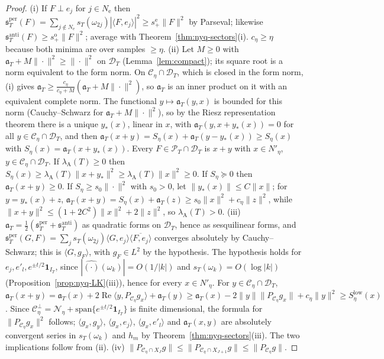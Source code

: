 \documentclass[11pt]{amsart}
\theoremstyle{definition}
\theoremstyle{remark}
\newcommand{\Rel}{\operatorname{Re}}
\newcommand{\PT}{\mathcal P_T}
\newcommand{\IT}{I_T}
\newcommand{\lamA}{\lambda_{\mathrm A}(T)}
\begin{document}
\begin{proof}
(i) If $F\perp e_j$ for $j\in N_{\mathrm e}$ then $\mathfrak s^{\mathrm{per}}_T(F)=\sum_{j\notin N_{\mathrm e}}s_T(\omega_{2j})|\langle F,e_j\rangle|^2
\ge s^{\mathrm e}_+\|F\|^2$ by Parseval; likewise $\mathfrak s^{\mathrm{anti}}_T(F)\ge s^{\mathrm o}_+\|F\|^2$; average with
Theorem~\ref{thm:nyq-sectors}(i). $c_\eta\ge\eta$ because both minima are over samples $\ge\eta$.
(ii) Let $M\ge0$ with $\mathfrak a_T+M\|\cdot\|^2\ge\|\cdot\|^2$ on $\mathcal D_T$ (Lemma~\ref{lem:compact}); its square root is a
norm equivalent to the form norm. On $\mathcal C_\eta\cap\mathcal D_T$, which is closed in the form norm, (i) gives
$\mathfrak a_T\ge\frac{c_\eta}{c_\eta+M}(\mathfrak a_T+M\|\cdot\|^2)$, so $\mathfrak a_T$ is an inner product on it with an
equivalent complete norm. The functional $y\mapsto\mathfrak a_T(y,x)$ is bounded for this norm (Cauchy--Schwarz for
$\mathfrak a_T+M\|\cdot\|^2$), so by the Riesz representation theorem there is a unique $y_*(x)$, linear in $x$, with
$\mathfrak a_T(y,x+y_*(x))=0$ for all $y\in\mathcal C_\eta\cap\mathcal D_T$, and then
$\mathfrak a_T(x+y)=S_\eta(x)+\mathfrak a_T(y-y_*(x))\ge S_\eta(x)$ with $S_\eta(x)=\mathfrak a_T(x+y_*(x))$. Every
$F\in\PT\cap\mathcal D_T$ is $x+y$ with $x\in N'_\eta$, $y\in\mathcal C_\eta\cap\mathcal D_T$. If $\lamA\ge0$ then
$S_\eta(x)\ge\lamA\|x+y_*\|^2\ge\lamA\|x\|^2\ge0$. If $S_\eta\succeq0$ then $\mathfrak a_T(x+y)\ge0$. If
$S_\eta\ge s_0\|\cdot\|^2$ with $s_0>0$, let $\|y_*(x)\|\le C\|x\|$; for $y=y_*(x)+z$,
$\mathfrak a_T(x+y)=S_\eta(x)+\mathfrak a_T(z)\ge s_0\|x\|^2+c_\eta\|z\|^2$, while $\|x+y\|^2\le(1+2C^2)\|x\|^2+2\|z\|^2$, so
$\lamA>0$.
(iii) $\mathfrak a_T=\frac12(\mathfrak s^{\mathrm{per}}_T+\mathfrak s^{\mathrm{anti}}_T)$ as quadratic forms on $\mathcal D_T$, hence as
sesquilinear forms, and $\mathfrak s^{\mathrm{per}}_T(G,F)=\sum_js_T(\omega_{2j})\langle G,e_j\rangle\overline{\langle F,e_j\rangle}$
converges absolutely by Cauchy--Schwarz; this is $\langle G,g_F\rangle$, with $g_F\in L^2$ by the hypothesis. The
hypothesis holds for $e_j,e'_l,e^{\pm t/2}\mathbf 1_{\IT}$, since $|\widehat{(\cdot)}(\omega_k)|=O(1/|k|)$ and
$s_T(\omega_k)=O(\log|k|)$ (Proposition~\ref{prop:nyq-LK}(iii)), hence for every $x\in N'_\eta$. For
$y\in\mathcal C_\eta\cap\mathcal D_T$,
$\mathfrak a_T(x+y)=\mathfrak a_T(x)+2\Rel\langle y,P_{\mathcal C_\eta}g_x\rangle+\mathfrak a_T(y)
\ge\mathfrak a_T(x)-2\|y\|\|P_{\mathcal C_\eta}g_x\|+c_\eta\|y\|^2\ge S^{\mathrm{low}}_\eta(x)$. Since
$\mathcal C_\eta^\perp=\mathcal N_\eta+\mathrm{span}\{e^{\pm t/2}\mathbf 1_{\IT}\}$ is finite dimensional, the formula for
$\|P_{\mathcal C_\eta}g_x\|^2$ follows; $\langle g_x,g_y\rangle$, $\langle g_x,e_j\rangle$, $\langle g_x,e'_l\rangle$ and
$\mathfrak a_T(x,y)$ are absolutely convergent series in $s_T(\omega_k)$ and $h_m$ by Theorem~\ref{thm:nyq-sectors}(iii).
The two implications follow from (ii).
(iv) $\|P_{\mathcal C_\eta\cap X_J}g\|\le\|P_{\mathcal C_\eta\cap X_{J+1}}g\|\le\|P_{\mathcal C_\eta}g\|$.
\end{proof}
\end{document}
